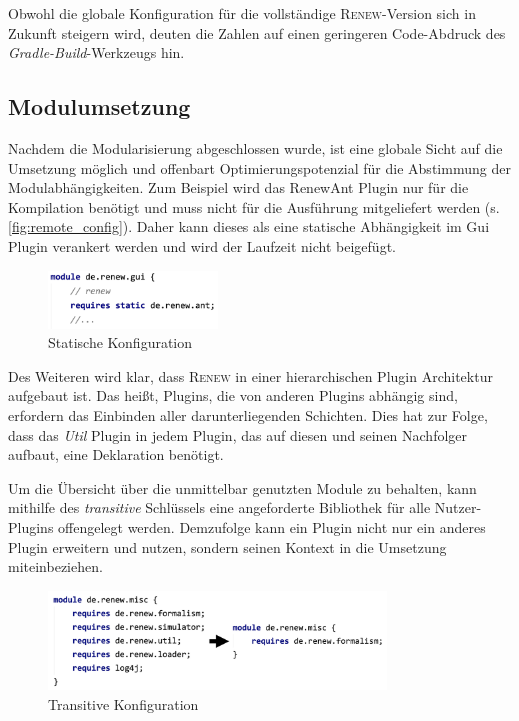 	Obwohl die globale Konfiguration für die vollständige \textsc{Renew}-Version sich in Zukunft steigern wird, deuten die Zahlen auf einen geringeren Code-Abdruck des \textit{Gradle-Build}-Werkzeugs hin.\bigbreak

\subsection{Modulumsetzung} \label{sub:optimierung}%
	Nachdem die Modularisierung abgeschlossen wurde, ist eine globale Sicht auf die Umsetzung möglich und offenbart Optimierungspotenzial für die Abstimmung der Modulabhängigkeiten. Zum Beispiel wird das RenewAnt Plugin nur für die Kompilation benötigt und muss nicht für die Ausführung mitgeliefert werden (s. \ref{fig:remote_config}). Daher kann dieses als eine statische Abhängigkeit im Gui Plugin verankert werden und wird der Laufzeit nicht beigefügt.\bigbreak

	\begin{figure}[h!]
	  \centering
	  \includegraphics[width=0.4\textwidth]{material/images/gui_config.png}
	  \caption{Statische Konfiguration}
	  \label{fig:gui_config}
	\end{figure}

	Des Weiteren wird klar, dass \textsc{Renew} in einer hierarchischen Plugin Architektur aufgebaut ist. Das heißt, Plugins, die von anderen Plugins abhängig sind, erfordern das Einbinden aller darunterliegenden Schichten. Dies hat zur Folge, dass das \textit{Util} Plugin in jedem Plugin, das auf diesen und seinen Nachfolger aufbaut, eine Deklaration benötigt. \newline

	Um die Übersicht über die unmittelbar genutzten Module zu behalten, kann mithilfe des \textit{transitive}  Schlüssels eine angeforderte Bibliothek für alle Nutzer-Plugins offengelegt werden. Demzufolge kann ein Plugin nicht nur ein anderes Plugin erweitern und nutzen, sondern seinen Kontext in die Umsetzung miteinbeziehen. \bigbreak

	\begin{figure}[h!]
	  \centering
	  \includegraphics[width=0.8\textwidth]{material/images/misc_trans.png}
	  \caption{Transitive Konfiguration}
	  \label{fig:trans_config}
	\end{figure}

